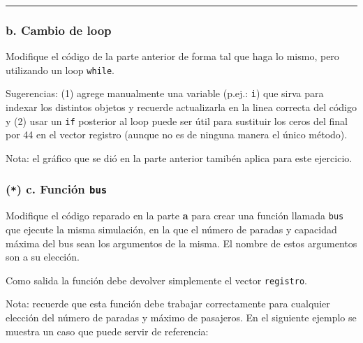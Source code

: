 \documentclass[]{article}
\begin{document}
\begin{center}\rule{3in}{0.4pt}\end{center}

\subsubsection{b. Cambio de loop}

Modifique el código de la parte anterior de forma tal que haga lo mismo,
pero utilizando un loop \texttt{while}.

Sugerencias: (1) agrege manualmente una variable (p.ej.: \texttt{i}) que
sirva para indexar los distintos objetos y recuerde actualizarla en la
linea correcta del código y (2) usar un \texttt{if} posterior al loop
puede ser útil para sustituir los ceros del final por 44 en el vector
registro (aunque no es de ninguna manera el único método).

Nota: el gráfico que se dió en la parte anterior tamibén aplica para
este ejercicio.

\subsubsection{(\texttt{*}) c. Función \texttt{bus}}

Modifique el código reparado en la parte \textbf{a} para crear una
función llamada \texttt{bus} que ejecute la misma simulación, en la que
el número de paradas y capacidad máxima del bus sean los argumentos de
la misma. El nombre de estos argumentos son a su elección.

Como salida la función debe devolver simplemente el vector
\texttt{registro}.

Nota: recuerde que esta función debe trabajar correctamente para
cualquier elección del número de paradas y máximo de pasajeros. En el
siguiente ejemplo se muestra un caso que puede servir de referencia:
\end{document}
